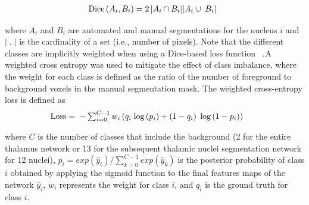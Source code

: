 \documentclass[3p,,final,12pt]{elsarticle}
\begin{document}
\let\saveeqnno\theequation
\let\savefrac\frac
\def\dispfrac{\displaystyle\savefrac}
\begin{eqnarray}
\let\frac\dispfrac
\gdef\theequation{2}
\let\theHequation\theequation
\label{disp-formula-group-2aaeb239840b4f1cb28b6c85d1a9f87b}
\begin{array}{@{}l}\text{Dice}\left(A_i,B_i\right)=\frac{2\left\vert A_i\cap B_i\right\vert}{\left\vert A_i\cup\;B_i\right\vert}\end{array}
\end{eqnarray}
\global\let\theequation\saveeqnno
\addtocounter{equation}{-1}\ignorespaces 
where $A_i $ and $B_i $ are automated and manual segmentations for the nucleus $i $ and $\vert\;.\;\vert $ is the cardinality of a set (i.e., number of pixels). Note that the different classes are implicitly weighted when using a Dice-based loss function \unskip~\cite{1643371:26789964,1643371:26789945}.\ensuremath{^{}}A weighted cross entropy was used to mitigate the effect of class imbalance, where the weight for each class is defined as the ratio of the number of foreground to background voxels in the manual segmentation mask. The weighted cross-entropy loss is defined as
\let\saveeqnno\theequation
\let\savefrac\frac
\def\dispfrac{\displaystyle\savefrac}
\begin{eqnarray}
\let\frac\dispfrac
\gdef\theequation{3}
\let\theHequation\theequation
\label{dfg-8128ef3038a4}
\begin{array}{@{}l}\text{Loss}=\;-\sum\nolimits_{i=0}^{C-1}w_i\left(q_i\;\text{log}\left(p_i\right)+\left(1-q_i\right)\;\text{log}\left(1-p_i\right)\right)\;\;\;\;\;\end{array}
\end{eqnarray}
\global\let\theequation\saveeqnno
\addtocounter{equation}{-1}\ignorespaces 
where $C $ is the number of classes that include the background (2 for the entire thalamus network or 13 for the subsequent thalamic nuclei segmentation network for 12 nuclei), $p_i={{exp}{({\widehat y}_i)}}/{\sum\nolimits_{k=0}^{C-1}{{{exp}{({\widehat y}_k)}}\;}} $is the posterior probability of class $i $ obtained by applying the sigmoid function to the final features maps of the network ${\widehat y}_i $, $w_i $ represents the weight for class $i $, and $q_i $ is the ground truth for class $i $.
\end{document}
